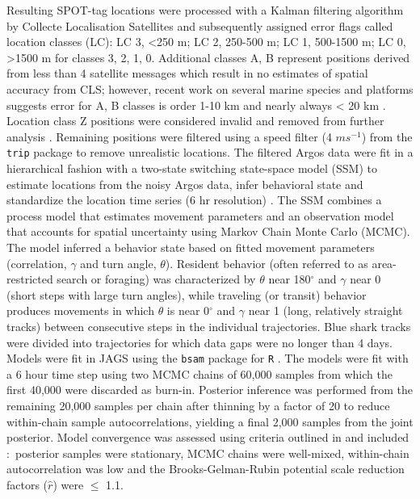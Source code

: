 Resulting SPOT-tag locations were processed with a Kalman filtering algorithm by Collecte Localisation Satellites \citep{Lopez2014} and subsequently assigned error flags called location classes (LC): LC 3, <250 m; LC 2, 250-500 m; LC 1, 500-1500 m; LC 0, >1500 m for classes 3, 2, 1, 0. Additional classes A, B represent positions derived from less than 4 satellite messages which result in no estimates of spatial accuracy from CLS; however, recent work on several marine species and platforms suggests error for A, B classes is order 1-10 km and nearly always < 20 km \citep{Lopez2014}. Location class Z positions were considered invalid and removed from further analysis \citep{CLS2016}. Remaining positions were filtered using a speed filter (4 $m s^{-1}$) from the \texttt{trip} package \citep{Sumner2009} to remove unrealistic locations. The filtered Argos data were fit in a hierarchical fashion with a two-state switching state-space model (SSM) to estimate locations from the noisy Argos data, infer behavioral state and standardize the location time series (6 hr resolution) \citep{Jonsen2016}. The SSM combines a process model that estimates movement parameters and an observation model that accounts for spatial uncertainty using Markov Chain Monte Carlo (MCMC). The model inferred a behavior state based on fitted movement parameters (correlation, $\gamma$ and turn angle, $\theta$). Resident behavior (often referred to as area-restricted search or foraging) was characterized by $\theta$ near 180$^{\circ}$ and $\gamma$ near 0 (short steps with large turn angles), while traveling (or transit) behavior produces movements in which $\theta$ is near 0$^{\circ}$ and $\gamma$ near 1 (long, relatively straight tracks) between consecutive steps in the individual trajectories. Blue shark tracks were divided into trajectories for which data gaps were no longer than 4 days. Models were fit in JAGS \citep{Plummer2004} using the \texttt{bsam} package \citep{Jonsen2016} for \texttt{R} \citep{RDevelopmentCoreTeam2015}. The models were fit with a 6 hour time step using two MCMC chains of 60,000 samples from which the first 40,000 were discarded as burn-in. Posterior inference was performed from the remaining 20,000 samples per chain after thinning by a factor of 20 to reduce within-chain sample autocorrelations, yielding a final 2,000 samples from the joint posterior. Model convergence was assessed using criteria outlined in \citep{Jonsen2016} and included$\colon$ posterior samples were stationary, MCMC chains were well-mixed, within-chain autocorrelation was low and the Brooks-Gelman-Rubin potential scale reduction factors ($\hat{r}$) were $\leq$ 1.1.

